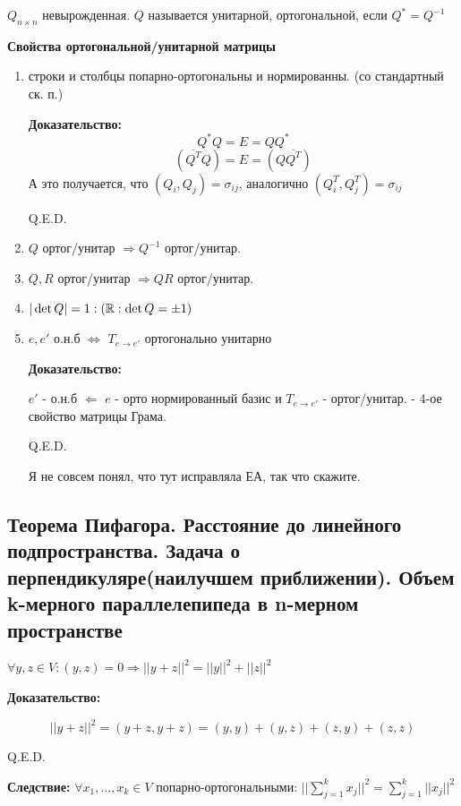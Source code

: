  $Q_{n\times n}$ невырожденная. $Q$ называется унитарной, ортогональной, если $Q^* = Q^{-1}$

\textbf{Свойства ортогональной/унитарной матрицы}

\begin{enumerate}
    \item строки и столбцы попарно-ортогональны и нормированны. (со стандартный ск. п.)

\textbf{Доказательство:}
    $$Q^* Q = E = Q Q^*$$
    $$(\overline{Q^T} Q ) =E = (Q \overline{Q^T})$$
    А это получается, что $(Q_i,Q_j) = \sigma_{ij}$, аналогично $(Q_i^T,Q_j^T) = \sigma_{ij}$

    \hfill Q.E.D.

    \item $Q$ ортог/унитар $\Rightarrow Q^{-1}$ ортог/унитар.

    \item $Q,R$ ортог/унитар $\Rightarrow QR$ ортог/унитар.
    \item $|\det Q | = 1 :(\mathbb{R}: \det Q = \pm 1 )$
    \item $e,e'$ о.н.б $\Leftrightarrow$ $T_{e\rightarrow e'}$ ортогонально унитарно

    \textbf{Доказательство:}
    
    $e'$ - о.н.б $\Leftarrow$ $e$ - орто нормированный базис и $T_{e\rightarrow e'}$ - ортог/унитар. - 4-ое свойство матрицы Грама.

    \hfill Q.E.D.

    Я не совсем понял, что тут исправляла ЕА, так что скажите.

\end{enumerate}

\pagebreak
\subsection{Теорема Пифагора. Расстояние до линейного подпространства. Задача о перпендикуляре(наилучшем приближении). Объем k-мерного параллелепипеда в n-мерном пространстве}


$\forall y,z \in V: (y,z) = 0 \Rightarrow ||y+z||^2 = ||y||^2 + ||z||^2$

\textbf{Доказательство:}

$$||y+z||^2 = (y+z,y+z) = (y,y) + (y,z) + (z,y) + (z,z)$$

\hfill Q.E.D.

\textbf{Следствие:} $\forall x_1,\ldots ,x_k \in V$ попарно-ортогональными: $||\sum\limits_{j=1}^k x_j||^2 = \sum\limits_{j=1}^k||x_j||^2$


